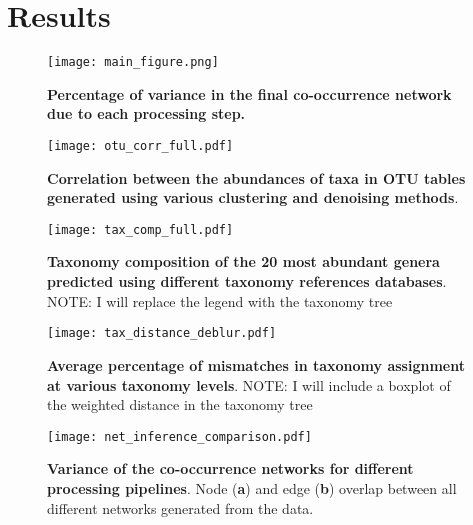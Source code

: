 
\section*{Results}

  \begin{figure}[h]
    \begin{center}
      \texttt{[image: main\_figure.png]}
      \caption{\textbf{Percentage of variance in the final co-occurrence network due to each processing step.} }
      \label{fig:variance}
    \end{center}
  \end{figure}

  \begin{figure}[h]
    \begin{center}
      \texttt{[image: otu\_corr\_full.pdf]}
      \caption{\textbf{Correlation between the abundances of taxa in OTU tables generated using various clustering and denoising methods}. }
      \label{fig:otu_correlations}
    \end{center}
  \end{figure}

  \begin{figure}[h]
    \begin{center}
      \texttt{[image: tax\_comp\_full.pdf]}
      \caption{\textbf{Taxonomy composition of the 20 most abundant genera predicted using different taxonomy references databases}. NOTE: I will replace the legend with the taxonomy tree}
      \label{fig:tax_comp}
    \end{center}
  \end{figure}

  \begin{figure}[h]
    \begin{center}
      \texttt{[image: tax\_distance\_deblur.pdf]}
      \caption{\textbf{Average percentage of mismatches in taxonomy assignment at various taxonomy levels}. NOTE: I will include a boxplot of the weighted distance in the taxonomy tree}
      \label{fig:otu_correlations}
    \end{center}
  \end{figure}

  \begin{figure}[h]
    \begin{center}
      \texttt{[image: net\_inference\_comparison.pdf]}
      \caption{\textbf{Variance of the co-occurrence networks for different processing pipelines}.  Node (\textbf{a})  and edge (\textbf{b}) overlap between all different networks generated from the data.}
      \label{fig:network_heatmap}
    \end{center}
  \end{figure}


